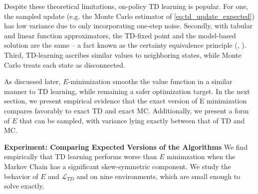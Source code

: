 \documentclass{article}
\theoremstyle{plain}
\theoremstyle{definition}
\theoremstyle{remark}
\begin{document}
Despite these theoretical limitations, on-policy TD learning is popular. For one, the sampled update (e.g. the Monte Carlo estimator of \eqref{eq:td_update_expected}) has low variance due to only incorporating one-step noise. Secondly, with tabular and linear function approximators, the TD-fixed point and the model-based solution are the same -- a fact known as the certainty equivalence principle (\citep{sutton_td}, \citep{parr2008analysis}). Third, TD-learning ascribes similar values to neighboring states, while Monte Carlo treats each state as disconnected. 

As discussed later, $E$-minimization smooths the value function in a similar manner to TD learning, while remaining a safer optimization target. In the next section, we present empirical evidence that the exact version of E minimization compares favorably to exact TD and exact MC. Additionally, we present a form of $E$ that can be sampled, with variance lying exactly between that of TD and MC.

\textbf{Experiment: Comparing Expected Versions of the Algorithms}
We find empirically that TD learning performs worse than $E$ minimzation when the Markov Chain has a significant skew-symmetric component. We study the behavior of $E$ and $\mathcal{L}_{TD}$ and on nine environments, which are small enough to solve exactly.
\end{document}
